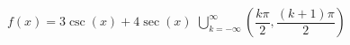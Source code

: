 { $f(x) = 3\csc(x) + 4\sec(x)$ }
{ $\displaystyle \bigcup_{k=-\infty}^{\infty} \left( \dfrac{k\pi}{2}, \dfrac{(k+1)\pi}{2} \right)$}
